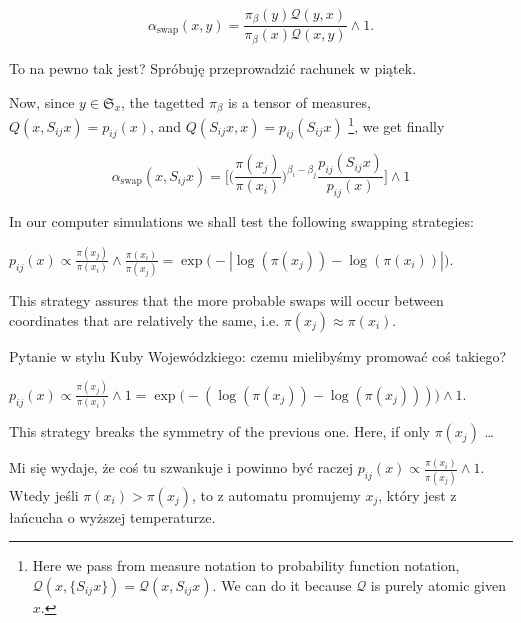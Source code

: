 $$\alpha_\text{swap}(x,y) =  \frac{\pi_\beta( y ) \mathcal{Q}(y, x)}{\pi_\beta( x ) \mathcal{Q}(x, y)} \wedge 1.$$


\begin{questions}[resume]
	\item To na pewno tak jest? Spróbuję przeprowadzić rachunek w piątek.
\end{questions}

	Now, since $y \in \mathfrak{S}_x $, the tagetted $\pi_\beta$ is a tensor of measures, $Q(x, S_{ij} x) = p_{ij}(x)$, and $Q( S_{ij} x, x) = p_{ij}(S_{ij}x)$ \footnote{Here we pass from measure notation to probability function notation, $\mathcal{Q}(x, \{S_{ij}x \}) = \mathcal{Q}(x, S_{ij}x)$. We can do it because $\mathcal{Q}$ is purely atomic given $x$.}, we get finally 

\begin{equation*}
	\alpha_\text{swap}(x,S_{ij} x) = \Big[  \Big(\frac{\pi(x_j)}{\pi(x_i)} \Big)^{\beta_i - \beta_j}  \frac{ p_{ij}(S_{ij} x )}{ p_{ij}( x ) }\Big] \wedge 1
\end{equation*}	
	
	In our computer simulations we shall test the following swapping strategies:
	
\begin{strategy}
	\item $p_{ij}(x) \propto \frac{\pi (x_j)}{\pi( x_i )} \wedge \frac{\pi (x_i)}{\pi( x_j )} = \exp \Big( - | \log ( \pi(x_j) ) - \log ( \pi(x_i) ) | \Big).$ 
\end{strategy}

	This strategy assures that the more probable swaps will occur between coordinates that are relatively the same, i.e. $\pi (x_j) \approx \pi (x_i)$. 
	
\begin{questions}[resume]
	\item Pytanie w stylu Kuby Wojewódzkiego: czemu mielibyśmy promować coś takiego?
\end{questions}		
	
\begin{strategy}[resume]
	\item $p_{ij}(x) \propto \frac{\pi (x_j)}{\pi (x_i)} \wedge 1 = \exp \Big( - ( \log ( \pi(x_j) ) - \log ( \pi(x_j) ) )\Big) \wedge 1.$
\end{strategy}

	This strategy breaks the symmetry of the previous one. Here, if only $\pi(x_j)$ \dots 
	
\begin{questions}[resume]
	\item Mi się wydaje, że coś tu szwankuje i powinno być raczej $p_{ij}(x) \propto \frac{\pi (x_i)}{\pi (x_j)} \wedge 1 $. Wtedy jeśli $\pi(x_i) > \pi (x_j)$, to z automatu promujemy $x_j$, który jest z łańcucha o wyższej temperaturze. 
\end{questions}
	
